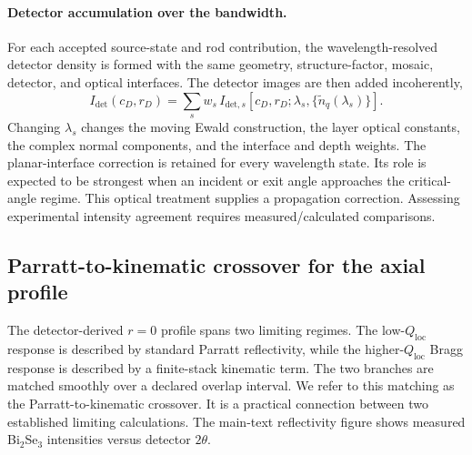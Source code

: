 \paragraph{Detector accumulation over the bandwidth.}
For each accepted source-state and rod contribution, the wavelength-resolved detector density is formed with
the same geometry, structure-factor, mosaic, detector, and optical interfaces.
The detector images are then added incoherently,
\begin{equation}
  I_{\mathrm{det}}(c_D,r_D)
  =
  \sum_s
  w_s\,
  I_{\mathrm{det},s}\!\left[c_D,r_D;\lambda_s,\{\tilde n_q(\lambda_s)\}\right].
  \label{eq:si_detector_bandwidth_sum}
\end{equation}
Changing $\lambda_s$ changes the moving Ewald construction, the layer optical
constants, the complex normal components, and the interface and depth weights.
The planar-interface correction is retained for every wavelength state. Its
role is expected to be strongest when an incident or exit angle approaches the
critical-angle regime. This optical treatment supplies a propagation correction. Assessing experimental intensity agreement requires measured/calculated comparisons.


\subsection{Parratt-to-kinematic crossover for the axial profile}
\label{subsec:si_parratt_structure_crossover}

The detector-derived $r=0$ profile spans two limiting regimes. The low-$Q_{\mathrm{loc}}$ response is described by standard Parratt reflectivity, while the higher-$Q_{\mathrm{loc}}$ Bragg response is described by a finite-stack kinematic term. The two branches are matched smoothly over a declared overlap interval. We refer to this matching as the Parratt-to-kinematic crossover. It is a practical connection between two established limiting calculations. The main-text reflectivity figure shows measured Bi$_2$Se$_3$ intensities versus detector $2\theta$.


